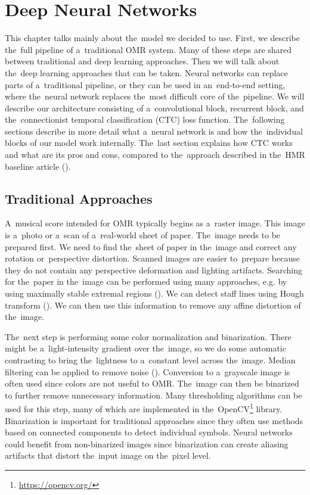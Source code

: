 \chapter{Deep Neural Networks}
\label{chap:DeepNeuralNetwork}

This chapter talks mainly about the~model we decided to use. First, we describe the~full pipeline of a~traditional OMR system. Many of these steps are shared between traditional and deep learning approaches. Then we will talk about the~deep learning approaches that can be taken. Neural networks can replace parts of a~traditional pipeline, or they can be used in an~end-to-end setting, where the~neural network replaces the~most difficult core of the~pipeline. We will describe our architecture consisting of a~convolutional block, recurrent block, and the~connectionist temporal classification (CTC) loss function. The~following sections describe in more detail what a~neural network is and how the~individual blocks of our model work internally. The~last section explains how CTC works and what are its pros and cons, compared to the~approach described in the~HMR baseline article (\cite{HmrBaseline}).


\section{Traditional Approaches}

A~musical score intended for OMR typically begins as a~raster image. This image is a~photo or a~scan of a~real-world sheet of paper. The~image needs to be prepared first. We need to find the~sheet of paper in the~image and correct any rotation or~perspective distortion. Scanned images are easier to~prepare because they do not contain any perspective deformation and lighting artifacts. Searching for the~paper in the~image can be performed using many approaches, e.g. by using maximally stable extremal regions (\cite{MSER}). We can detect staff lines using Hough transform (\cite{Hough}). We can then use this information to remove any affine distortion of the~image.

The~next step is performing some color normalization and binarization. There might be a~light-intensity gradient over the~image, so we do some automatic contrasting to bring the~lightness to a~constant level across the~image. Median filtering can be applied to remove noise (\cite{MedianFiltering}). Conversion to a~grayscale image is often used since colors are not useful to OMR. The~image can then be binarized to further remove unnecessary information. Many thresholding algorithms can be used for this step, many of which are implemented in the~OpenCV\footnote{\href{https://opencv.org/}{https://opencv.org/}} library. Binarization is important for traditional approaches since they often use methods based on connected components to detect individual symbols. Neural networks could benefit from non-binarized images since binarization can create aliasing artifacts that distort the~input image on the~pixel level.

